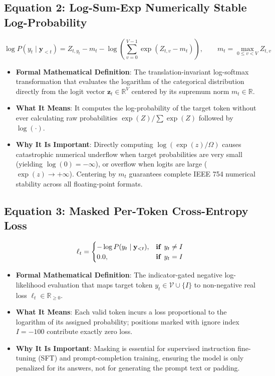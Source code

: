 \documentclass[11pt,a4paper]{article}
\theoremstyle{definition}
\begin{document}
\subsection{\textbf{Equation 2: Log-Sum-Exp Numerically Stable Log-Probability}}
{\boldmath
\begin{equation}
\log P(y_t \mid \mathbf{y}_{<t}) = Z_{t, y_t} - m_t - \log\left(\sum_{v=0}^{V-1} \exp(Z_{t, v} - m_t)\right), \qquad m_t = \max_{0 \le v < V} Z_{t, v}
\end{equation}
}
\begin{itemize}
    \item \textbf{Formal Mathematical Definition}:
    The translation-invariant log-softmax transformation that evaluates the logarithm of the categorical distribution directly from the logit vector $\mathbf{z}_t \in \mathbb{R}^V$ centered by its supremum norm $m_t \in \mathbb{R}$.
    \item \textbf{What It Means}:
    It computes the log-probability of the target token without ever calculating raw probabilities $\exp(Z) / \sum \exp(Z)$ followed by $\log(\cdot)$.
    \item \textbf{Why It Is Important}:
    Directly computing $\log(\exp(z)/\Omega)$ causes catastrophic numerical underflow when target probabilities are very small (yielding $\log(0) = -\infty$), or overflow when logits are large ($\exp(z) \to +\infty$). Centering by $m_t$ guarantees complete IEEE 754 numerical stability across all floating-point formats.
\end{itemize}

\subsection{\textbf{Equation 3: Masked Per-Token Cross-Entropy Loss}}
{\boldmath
\begin{equation}
\ell_t = \begin{cases} -\log P(y_t \mid \mathbf{y}_{<t}), & \text{\textbf{if }} y_t \ne I \\ 0.0, & \text{\textbf{if }} y_t = I \end{cases}
\end{equation}
}
\begin{itemize}
    \item \textbf{Formal Mathematical Definition}:
    The indicator-gated negative log-likelihood evaluation that maps target token $y_t \in \mathcal{V} \cup \{I\}$ to non-negative real loss $\ell_t \in \mathbb{R}_{\ge 0}$.
    \item \textbf{What It Means}:
    Each valid token incurs a loss proportional to the logarithm of its assigned probability; positions marked with ignore index $I = -100$ contribute exactly zero loss.
    \item \textbf{Why It Is Important}:
    Masking is essential for supervised instruction fine-tuning (SFT) and prompt-completion training, ensuring the model is only penalized for its answers, not for generating the prompt text or padding.
\end{itemize}
\end{document}
